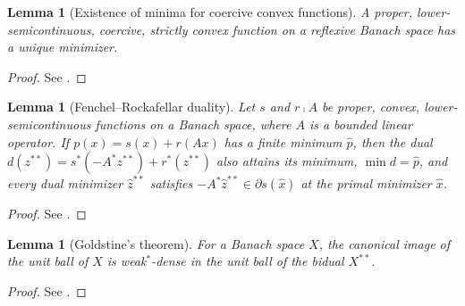 \documentclass{article}
\newtheorem{lemma}[theorem]{Lemma}
\begin{document}
\begin{lemma}[Existence of minima for coercive convex functions]
\label{lem:coercive-minimum}
A proper, lower-semicontinuous, coercive, strictly convex function
on a reflexive Banach space
has a unique minimizer.
\end{lemma}
\begin{proof}
See \citet[Theorem~2.19]{peypouquet2015convex}.
\end{proof}

\begin{lemma}[Fenchel--Rockafellar duality]
\label{lem:fenchel-rockafellar}
Let $s$ and $r \comp A$ be proper, convex, lower-semicontinuous
functions on a Banach space,
where $A$ is a bounded linear operator.
If $p(x) = s(x) + r(Ax)$ has a finite minimum $\hat p$,
then the dual
$d(z^{**}) = s^*(-A^* z^{**}) + r^*(z^{**})$
also attains its minimum,
$\min d = \hat p$,
and every dual minimizer $\hat z^{**}$
satisfies $-A^* \hat z^{**} \in \partial s(\hat x)$
at the primal minimizer $\hat x$.
\end{lemma}
\begin{proof}
See \citet[Theorem~3.50]{peypouquet2015convex}.
\end{proof}

\begin{lemma}[Goldstine's theorem]
\label{lem:goldstine}
For a Banach space $X$,
the canonical image of the unit ball of $X$
is weak$^*$-dense
in the unit ball of the bidual $X^{**}$.
\end{lemma}
\begin{proof}
See \citet[Theorem~2.6.26]{megginson2012introduction}.
\end{proof}
\end{document}
